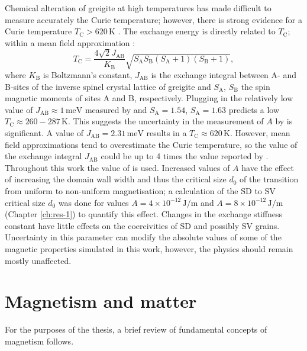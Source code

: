 Chemical alteration of greigite at high temperatures has made difficult to measure accurately the Curie temperature; however, there is strong evidence for a Curie temperature $T_\text{C}>620\,\text{K}$ \citep{Roberts2010}. The exchange energy is directly related to $T_\text{C}$; within a mean field approximation \citep{Kouvel1956}:
\begin{equation}
T_\text{C} = \frac{4\sqrt{2} J_\text{AB}}{K_\text{B}}\sqrt{S_\text{A}S_\text{B}(S_\text{A}+1)(S_\text{B}+1)},
\end{equation}
where $K_\text{B}$ is Boltzmann's constant, $J_\text{AB}$ is the exchange integral between A- and B-sites of the inverse spinel crystal lattice of greigite and $S_\text{A},\, S_\text{B}$ the spin magnetic moments of sites A and B, respectively. Plugging in the relatively low value of $J_\text{AB}\approx 1\,\text{meV}$ measured by \citet{Chang2008} and $S_\text{A}=1.54$, $S_\text{A}=1.63$ \citep{Chang2009} predicts a low $T_\text{C} \approx 260-287 \, \text{K}$. This suggests the uncertainty in the measurement of $A$ by \citet{Chang2008} is significant. A value of $J_\text{AB}=2.31\,\text{meV}$ results in a $T_\text{C}\approx 620\,\text{K}$. However, mean field approximations tend to overestimate the Curie temperature, so the value of the exchange integral $J_\text{AB}$ could be up to 4 times the value reported by \citet{Chang2008}. Throughout this work the value of \citet{Chang2008} is used. Increased values of $A$ have the effect of increasing the domain wall width and thus the critical size $d_0$ of the transition from uniform to non-uniform magnetisation; a calculation of the SD to SV critical size $d_0$ was done for values $A=4\times10^{-12}\,\text{J}/\text{m}$ and $A=8\times10^{-12}\,\text{J}/\text{m}$ (Chapter \ref{ch:res-1}) to quantify this effect. Changes in the exchange stiffness constant have little effects on the coercivities of SD and possibly SV grains. Uncertainty in this parameter can modify the absolute values of some of the magnetic properties simulated in this work, however, the physics should remain mostly unaffected.\par

\section{Magnetism and matter}
For the purposes of the thesis, a brief review of fundamental concepts of magnetism follows.\par
 
